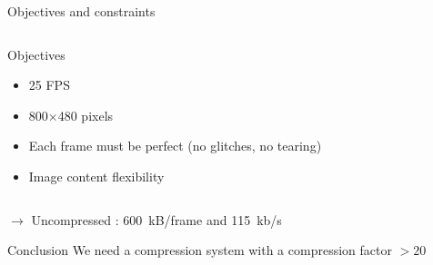 \documentclass[10pt, notes]{beamer}
\begin{document}
\begin{frame}{Objectives and constraints}
    \begin{columns}
        \begin{column}{0.49\textwidth}
            \begin{exampleblock}{Objectives}
                \begin{itemize}
                    \item 25 FPS
                    \item 800$\times$480 pixels
                    \item Each frame must be perfect (no glitches, no tearing)
                    \item Image content flexibility 
                \end{itemize}
            \end{exampleblock}
        \end{column}

    \end{columns}


    $\to$ Uncompressed : \SI{600}{kB/frame} and \SI{115}{kb/s}

    \begin{defaultblock}{Conclusion}
        We need a compression system with a compression factor $> 20$      
    \end{defaultblock}
\end{frame}
\end{document}
